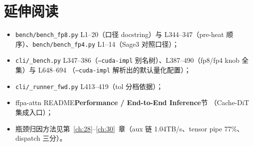 \section*{延伸阅读}
\begin{itemize}[itemsep=0pt,topsep=2pt]
  \item \texttt{bench/bench\_fp8.py} L1--20（口径 docstring）与
        L344--347（pre-heat 顺序）、\texttt{bench/bench\_fp4.py}
        L1--14（Sage3 对照口径）；
  \item \texttt{cli/\_bench.py} L347--386（\texttt{--cuda-impl}
        别名树）、L387--490（fp8/fp4 knob 全集）与 L648--694
        （\texttt{--cuda-impl} 解析出的默认量化配置）；
  \item \texttt{cli/\_runner\_fwd.py} L413--419（tol 分档依据）；
  \item ffpa-attn README\textbf{Performance / End-to-End Inference}节
        （Cache-DiT 集成入口）；
  \item 瓶颈归因方法见第~\ref{ch:28}--\ref{ch:30}~章（aux 链
        1.04TB/s、tensor pipe 77\%、dispatch 三分）。
\end{itemize}

